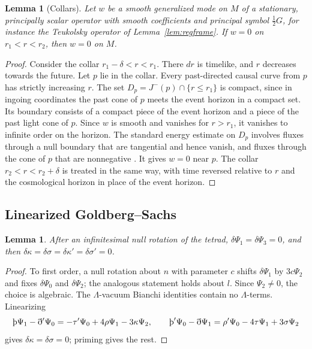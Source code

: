 \documentclass[11pt]{amsart}
\newtheorem{lemma}[theorem]{Lemma}
\theoremstyle{definition}
\theoremstyle{remark}
\numberwithin{equation}{section}
\newcommand{\Th}{\text{\th}}
\begin{document}
\begin{lemma}[Collars]\label{lem:collar}
Let $w$ be a smooth generalized mode on $M$ of a stationary, principally scalar operator with smooth coefficients
and principal symbol $\frac12G$, for instance the Teukolsky operator of Lemma~\ref{lem:regframe}. If $w=0$ on
$r_1<r<r_2$, then $w=0$ on $M$.
\end{lemma}

\begin{proof}
Consider the collar $r_1-\delta<r<r_1$. There $dr$ is timelike, and $r$ decreases towards the future. Let $p$ lie in
the collar. Every past-directed causal curve from $p$ has strictly increasing $r$. The set
$D_p=J^-(p)\cap\{r\le r_1\}$ is compact, since in ingoing coordinates the past cone of $p$ meets the event horizon
in a compact set. Its boundary consists of a compact piece of the event horizon and a piece of the past light cone
of $p$. Since $w$ is smooth and vanishes for $r>r_1$, it vanishes to infinite order on the horizon. The standard
energy estimate on $D_p$ involves fluxes through a null boundary that are tangential and hence vanish, and fluxes
through the cone of $p$ that are nonnegative \cite[\S23.2]{Hor85}. It gives $w=0$ near $p$. The collar
$r_2<r<r_2+\delta$ is treated in the same way, with time reversed relative to $r$ and the cosmological horizon in
place of the event horizon.
\end{proof}

\subsection{Linearized Goldberg--Sachs}
\begin{lemma}\label{lem:GS}
After an infinitesimal null rotation of the tetrad, $\delta\Psi_1=\delta\Psi_3=0$, and then
$\delta\kappa=\delta\sigma=\delta\kappa'=\delta\sigma'=0$.
\end{lemma}
\begin{proof}
To first order, a null rotation about $n$ with parameter $c$ shifts $\delta\Psi_1$ by $3c\Psi_2$ and fixes
$\delta\Psi_0$ and $\delta\Psi_2$; the analogous statement holds about $l$. Since $\Psi_2\ne0$, the choice is
algebraic. The $\Lambda$-vacuum Bianchi identities contain no $\Lambda$-terms. Linearizing
\[
\Th\Psi_1-\eth'\Psi_0=-\tau'\Psi_0+4\rho\Psi_1-3\kappa\Psi_2,\qquad
\Th'\Psi_0-\eth\Psi_1=\rho'\Psi_0-4\tau\Psi_1+3\sigma\Psi_2
\]
gives $\delta\kappa=\delta\sigma=0$; priming gives the rest.
\end{proof}
\end{document}
